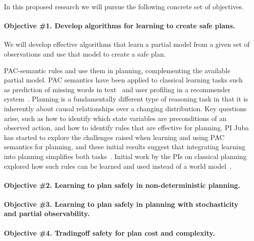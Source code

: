 \documentclass[12pt]{article}
\begin{document}
In this proposed research we will pursue the following concrete set of objectives. 


\paragraph{Objective \#1. Develop algorithms for learning to create safe plans.} 
We will develop effective algorithms that learn a partial model from a given set of observations 
and use that model to create a safe plan. 



PAC-semantic rules and use them in planning, complementing the available partial model. %
PAC semantics have been applied to classical learning tasks such as prediction of missing words in text~\cite{michael2008first} and user profiling in a recommender system~\cite{semeraro2009knowledge}. Planning is a fundamentally different type of reasoning task in that it is inherently about causal relationships over a changing distribution. Key questions arise, such as how to identify which state variables are preconditions of an observed action, and how to identify rules that are effective for planning. %
PI Juba has started to explore the challenges raised when learning and using PAC semantics for planning, and these initial results suggest that integrating learning into planning simplifies both tasks~\cite{juba2016jmlr}. Initial work by the PIs on classical planning explored how such rules can be learned and used instead of a world model~\cite{stern2017efficientAndSafe}. 





\paragraph{Objective \#2. Learning to plan safely in non-deterministic planning.}


\paragraph{Objective \#3. Learning to plan safely in planning with stochasticity and partial observability.}


\paragraph{Objective \#4. Tradingoff safety for plan cost and complexity.}
\end{document}
